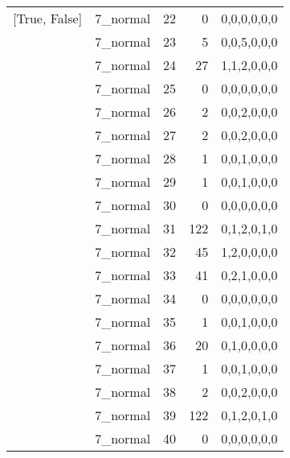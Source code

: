\begin{tabular}{llrrl}
 [True, False]   & 7\_normal            &            22 &                     0 & 0,0,0,0,0,0   \\
 [True, False]   & 7\_normal            &            23 &                     5 & 0,0,5,0,0,0   \\
 [True, False]   & 7\_normal            &            24 &                    27 & 1,1,2,0,0,0   \\
 [True, False]   & 7\_normal            &            25 &                     0 & 0,0,0,0,0,0   \\
 [True, False]   & 7\_normal            &            26 &                     2 & 0,0,2,0,0,0   \\
 [True, False]   & 7\_normal            &            27 &                     2 & 0,0,2,0,0,0   \\
 [True, False]   & 7\_normal            &            28 &                     1 & 0,0,1,0,0,0   \\
 [True, False]   & 7\_normal            &            29 &                     1 & 0,0,1,0,0,0   \\
 [True, False]   & 7\_normal            &            30 &                     0 & 0,0,0,0,0,0   \\
 [True, False]   & 7\_normal            &            31 &                   122 & 0,1,2,0,1,0   \\
 [True, False]   & 7\_normal            &            32 &                    45 & 1,2,0,0,0,0   \\
 [True, False]   & 7\_normal            &            33 &                    41 & 0,2,1,0,0,0   \\
 [True, False]   & 7\_normal            &            34 &                     0 & 0,0,0,0,0,0   \\
 [True, False]   & 7\_normal            &            35 &                     1 & 0,0,1,0,0,0   \\
 [True, False]   & 7\_normal            &            36 &                    20 & 0,1,0,0,0,0   \\
 [True, False]   & 7\_normal            &            37 &                     1 & 0,0,1,0,0,0   \\
 [True, False]   & 7\_normal            &            38 &                     2 & 0,0,2,0,0,0   \\
 [True, False]   & 7\_normal            &            39 &                   122 & 0,1,2,0,1,0   \\
 [True, False]   & 7\_normal            &            40 &                     0 & 0,0,0,0,0,0   \\

\end{tabular}

